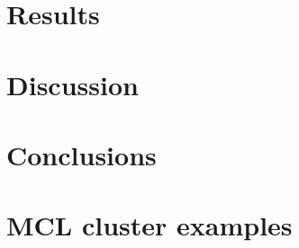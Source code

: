 \documentclass[11pt]{article}
\begin{document}







\section{Results}
\label{sec:results}

\section{Discussion}
\label{sec:discussion}

\section{Conclusions}
\label{sec:conclusions}

\appendix
\appendixpage

\section{MCL cluster examples}
\label{sec:mcl-cluster-examples}



\FloatBarrier


\end{document}
